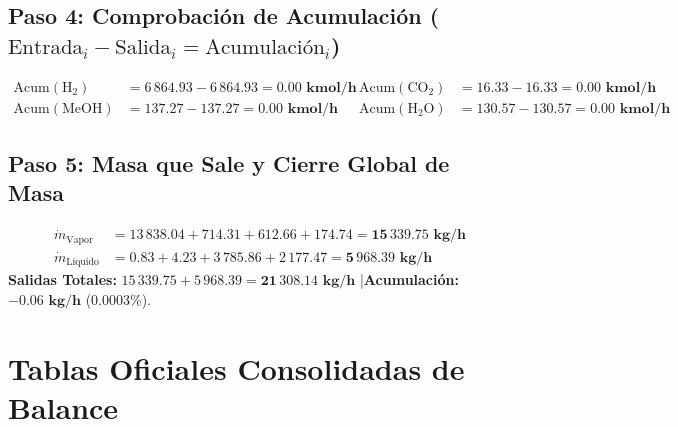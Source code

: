 \documentclass[11pt,letterpaper]{article}
\begin{document}
\subsection{\texorpdfstring{Paso 4: Comprobación de Acumulación ($\text{Entrada}_i - \text{Salida}_i = \text{Acumulación}_i$)}{Paso 4: Comprobación de Acumulación}}
\begin{align*}
    \text{Acum}(\text{H}_2) &= 6\,864.93 - 6\,864.93 = \mathbf{0.00\text{ kmol/h}} &
    \text{Acum}(\text{CO}_2) &= 16.33 - 16.33 = \mathbf{0.00\text{ kmol/h}} \\
    \text{Acum}(\text{MeOH}) &= 137.27 - 137.27 = \mathbf{0.00\text{ kmol/h}} &
    \text{Acum}(\text{H}_2\text{O}) &= 130.57 - 130.57 = \mathbf{0.00\text{ kmol/h}}
\end{align*}

\subsection{Paso 5: Masa que Sale y Cierre Global de Masa}
\begin{align*}
    \dot{m}_{\text{Vapor}} &= 13\,838.04 + 714.31 + 612.66 + 174.74 = \mathbf{15\,339.75\text{ kg/h}} \\
    \dot{m}_{\text{Líquido}} &= 0.83 + 4.23 + 3\,785.86 + 2\,177.47 = \mathbf{5\,968.39\text{ kg/h}}
\end{align*}
\textbf{Salidas Totales:} $15\,339.75 + 5\,968.39 = \mathbf{21\,308.14\text{ kg/h}}$ \quad|\quad \textbf{Acumulación:} $\mathbf{-0.06\text{ kg/h}}$ ($0.0003\%$).

\clearpage
\section{Tablas Oficiales Consolidadas de Balance}
\end{document}
